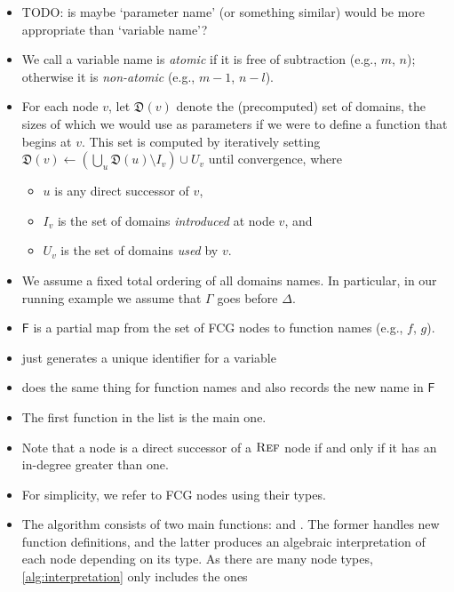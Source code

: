 \documentclass{article}
\theoremstyle{definition}
\theoremstyle{remark}
\DeclareMathOperator{\Reff}{\textsc{Ref}}
\begin{document}
\begin{itemize}
  \item TODO: is maybe `parameter name' (or something similar) would be more
        appropriate than `variable name'?
  \item We call a variable name is \emph{atomic} if it is free of subtraction
        (e.g., $m$, $n$); otherwise it is \emph{non-atomic} (e.g., $m-1$,
        $n-l$).
  \item For each node $v$, let $\mathfrak{D}(v)$ denote the (precomputed) set of
        domains, the sizes of which we would use as parameters if we were to
        define a function that begins at $v$. This set is computed by
        iteratively setting
        $\mathfrak{D}(v) \gets \left(\bigcup_{u} \mathfrak{D}(u) \setminus I_{v}\right) \cup U_{v}$
        until convergence, where
        \begin{itemize}
          \item $u$ is any direct successor of $v$,
          \item $I_{v}$ is the set of domains \emph{introduced} at node $v$, and
          \item $U_{v}$ is the set of domains \emph{used} by $v$.
        \end{itemize}
  \item We assume a fixed total ordering of all domains names. In particular, in
        our running example we assume that $\Gamma$ goes before $\Delta$.
  \item $\mathsf{F}$ is a partial map from the set of FCG nodes to function
        names (e.g., $f$, $g$).
  \item \newVariableName just generates a unique identifier for a variable
  \item \newFunctionName does the same thing for function names and also records
        the new name in $\mathsf{F}$
  \item The first function in the list is the main one.
  \item Note that a node is a direct successor of a $\Reff$ node if and only if
        it has an in-degree greater than one.
  \item For simplicity, we refer to FCG nodes using their types.
  \item The algorithm consists of two main functions: \visit and \actuallyVisit.
        The former handles new function definitions, and the latter produces an
        algebraic interpretation of each node depending on its type. As there
        are many node types, \cref{alg:interpretation} only includes the ones

\end{itemize}
\end{document}
